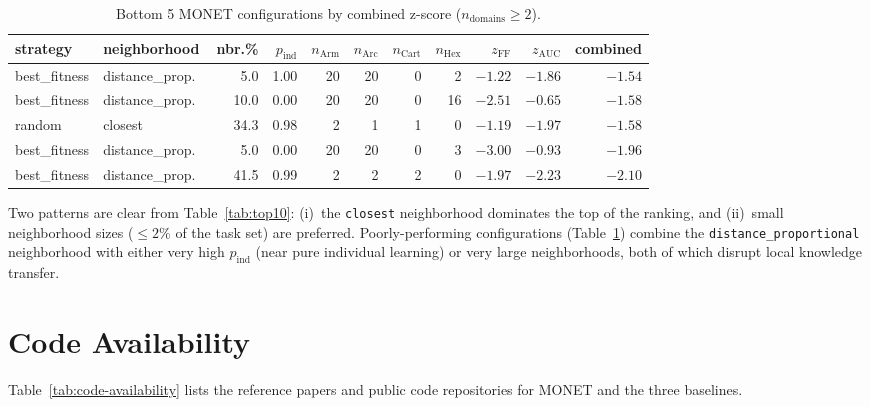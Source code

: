 \begin{table}[h]
\centering
\caption{Bottom 5 MONET configurations by combined z-score ($n_{\text{domains}} \ge 2$).}
\label{tab:bottom5}
\footnotesize
\setlength{\tabcolsep}{3pt}
\begin{tabular}{@{}llrrrrrrrrr@{}}
\toprule
strategy & neighborhood & nbr.\% & $p_\text{ind}$ & $n_\text{Arm}$ & $n_\text{Arc}$ & $n_\text{Cart}$ & $n_\text{Hex}$ & $z_{\text{FF}}$ & $z_{\text{AUC}}$ & combined \\
\midrule
best\_fitness & distance\_prop.\       &  5.0 & 1.00 & 20 & 20 &  0 &  2 & $-1.22$ & $-1.86$ & $-1.54$ \\
best\_fitness & distance\_prop.\       & 10.0 & 0.00 & 20 & 20 &  0 & 16 & $-2.51$ & $-0.65$ & $-1.58$ \\
random        & closest               & 34.3 & 0.98 &  2 &  1 &  1 &  0 & $-1.19$ & $-1.97$ & $-1.58$ \\
best\_fitness & distance\_prop.\       &  5.0 & 0.00 & 20 & 20 &  0 &  3 & $-3.00$ & $-0.93$ & $-1.96$ \\
best\_fitness & distance\_prop.\       & 41.5 & 0.99 &  2 &  2 &  2 &  0 & $-1.97$ & $-2.23$ & $\mathbf{-2.10}$ \\
\bottomrule
\end{tabular}
\end{table}

Two patterns are clear from Table~\ref{tab:top10}: (i)~the \texttt{closest} neighborhood dominates the top of the ranking, and (ii)~small neighborhood sizes ($\le 2\%$ of the task set) are preferred. Poorly-performing configurations (Table~\ref{tab:bottom5}) combine the \texttt{distance\_proportional} neighborhood with either very high $p_\text{ind}$ (near pure individual learning) or very large neighborhoods, both of which disrupt local knowledge transfer.

\section{Code Availability}\label{app:code}

Table~\ref{tab:code-availability} lists the reference papers and public code repositories for MONET and the three baselines.

